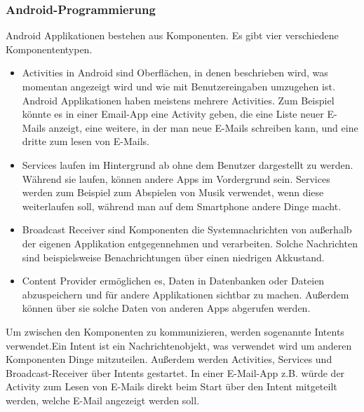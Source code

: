 \documentclass[extern,palatino]{cgBA}
\begin{document}
\subsubsection{Android-Programmierung}Android Applikationen bestehen aus Komponenten. Es gibt vier verschiedene Komponententypen.\cite{and1}
\begin{itemize}
	\item 
	Activities in Android sind Oberflächen, in denen beschrieben wird, was momentan angezeigt wird und wie mit Benutzereingaben umzugehen ist. Android Applikationen haben meistens mehrere Activities. Zum Beispiel könnte es in einer Email-App eine Activity geben, die eine Liste neuer E-Mails anzeigt, eine weitere, in der man neue E-Mails schreiben kann, und eine dritte zum lesen von E-Mails. \cite{and1}
	\item
	Services laufen im Hintergrund ab ohne dem Benutzer dargestellt zu werden. Während sie laufen, können andere Apps im Vordergrund sein. Services werden zum Beispiel zum  Abspielen von Musik verwendet, wenn diese weiterlaufen soll, während man auf dem Smartphone andere Dinge macht.\cite{and1}
	\item Broadcast Receiver sind Komponenten die Systemnachrichten von außerhalb der eigenen Applikation entgegennehmen und verarbeiten. Solche Nachrichten sind beispielsweise Benachrichtungen über einen niedrigen Akkustand.\cite{and1}
	\item Content Provider ermöglichen es, Daten in Datenbanken oder Dateien abzuspeichern und für andere Applikationen sichtbar zu machen. Außerdem können über sie solche Daten von anderen Apps abgerufen werden.\cite{and1}
\end{itemize}
Um zwischen den Komponenten zu kommunizieren, werden sogenannte Intents verwendet.Ein Intent ist ein Nachrichtenobjekt, was verwendet wird um anderen Komponenten Dinge mitzuteilen\cite{and2}. Außerdem werden Activities, Services und Broadcast-Receiver über Intents gestartet. In einer E-Mail-App z.B. würde der Activity zum Lesen von E-Mails direkt beim Start über den Intent mitgeteilt werden, welche E-Mail angezeigt werden soll.
\end{document}
